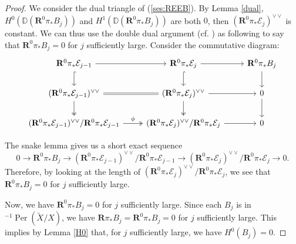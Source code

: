 \documentclass[12pt]{amsart}
\theoremstyle{definition}
\DeclareMathOperator{\Per}{Per}
\begin{document}
\begin{proof}
We consider the dual triangle
of (\ref{ses:REEB}).
By Lemma \ref{dual},
$H^0(\mathbb{D} (\mathbf{R}^0\pi_\ast B_j))$ and $ H^1(\mathbb{D} (\mathbf{R}^0\pi_\ast B_j))$ are both $0$, 
then $(\mathbf{R}^0\pi_\ast \mathcal{E}_{j})^{\vee \vee}$ is constant.
We can thus use the double dual argument (cf. \cite[Proposition 7.1]{Bri08}) as following to say that
$\mathbf{R}^0\pi_\ast B_j = 0$  for $j$ sufficiently large.
Consider the commutative diagram:
\[\begin{tikzcd}
\mathbf{R}^0\pi_\ast \mathcal{E}_{j-1} \arrow[r] \arrow[d, hook]                                 & \mathbf{R}^0\pi_\ast \mathcal{E}_{j} \arrow[r] \arrow[d, hook]                    & \mathbf{R}^0\pi_\ast B_j \arrow[d] \\
(\mathbf{R}^0\pi_\ast \mathcal{E}_{j-1})^{\vee \vee} \arrow[r, Rightarrow, no head] \arrow[d, two heads]      & (\mathbf{R}^0\pi_\ast \mathcal{E}_{j})^{\vee \vee} \arrow[r] \arrow[d, two heads] & 0 \arrow[d]      \\
(\mathbf{R}^0\pi_\ast \mathcal{E}_{j-1})^{\vee \vee}/\mathbf{R}^0\pi_\ast \mathcal{E}_{j-1} \arrow[r, "\phi", two heads] & (\mathbf{R}^0\pi_\ast \mathcal{E}_{j})^{\vee \vee}/\mathbf{R}^0\pi_\ast \mathcal{E}_{j} \arrow[r]     & 0               
\end{tikzcd}\]

The snake lemma gives us a short exact sequence
$$ 0 \longrightarrow \mathbf{R}^0\pi_\ast B_j  \longrightarrow (\mathbf{R}^0\pi_\ast \mathcal{E}_{j-1})^{\vee\vee}/\mathbf{R}^0\pi_\ast \mathcal{E}_{j-1} \longrightarrow (\mathbf{R}^0\pi_\ast\mathcal{E}_j)^{\vee\vee}/\mathbf{R}^0\pi_\ast\mathcal{E}_j \longrightarrow 0.$$
Therefore, by looking at the length of $(\mathbf{R}^0\pi_\ast\mathcal{E}_j)^{\vee\vee}/\mathbf{R}^0\pi_\ast\mathcal{E}_j$,
we see that $\mathbf{R}^0\pi_\ast B_j = 0$ for $j$ sufficiently large.


Now, we have $\mathbf{R}^0\pi_\ast B_j = 0$ for $j$ sufficiently large.
Since each $B_j$ is in ${^{-1}}\Per(\widetilde{X}/X)$, we have $\mathbf{R}\pi_\ast B_j=\mathbf{R}^0\pi_\ast B_j = 0$ for $j$ sufficiently large.
This implies by Lemma \ref{H0} that, for $j$ sufficiently large, we have $H^0(B_j)=0$.
\end{proof}
\end{document}
